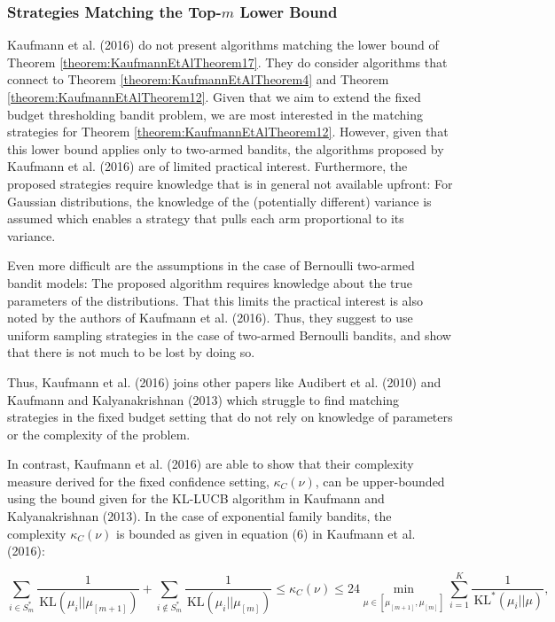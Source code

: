 \documentclass[11pt,]{article}
\newcommand{\KL}{\,\text{KL}}
\begin{document}
\subsubsection{\texorpdfstring{Strategies Matching the Top-\(m\) Lower
Bound}{Strategies Matching the Top-m Lower Bound}}\label{strategies-matching-the-top-m-lower-bound}

Kaufmann et al. (2016) do not present algorithms matching the lower
bound of Theorem \ref{theorem:KaufmannEtAlTheorem17}. They do consider
algorithms that connect to Theorem \ref{theorem:KaufmannEtAlTheorem4}
and Theorem \ref{theorem:KaufmannEtAlTheorem12}. Given that we aim to
extend the fixed budget thresholding bandit problem, we are most
interested in the matching strategies for Theorem
\ref{theorem:KaufmannEtAlTheorem12}. However, given that this lower
bound applies only to two-armed bandits, the algorithms proposed by
Kaufmann et al. (2016) are of limited practical interest. Furthermore,
the proposed strategies require knowledge that is in general not
available upfront: For Gaussian distributions, the knowledge of the
(potentially different) variance is assumed which enables a strategy
that pulls each arm proportional to its variance.

Even more difficult are the assumptions in the case of Bernoulli
two-armed bandit models: The proposed algorithm requires knowledge about
the true parameters of the distributions. That this limits the practical
interest is also noted by the authors of Kaufmann et al. (2016). Thus,
they suggest to use uniform sampling strategies in the case of two-armed
Bernoulli bandits, and show that there is not much to be lost by doing
so.

Thus, Kaufmann et al. (2016) joins other papers like Audibert et al.
(2010) and Kaufmann and Kalyanakrishnan (2013) which struggle to find
matching strategies in the fixed budget setting that do not rely on
knowledge of parameters or the complexity of the problem.

In contrast, Kaufmann et al. (2016) are able to show that their
complexity measure derived for the fixed confidence setting,
\(\kappa_C(\nu)\), can be upper-bounded using the bound given for the
KL-LUCB algorithm in Kaufmann and Kalyanakrishnan (2013). In the case of
exponential family bandits, the complexity \(\kappa_C(\nu)\) is bounded
as given in equation (6) in Kaufmann et al. (2016):

\begin{equation*}
\sum_{i \in S^*_m} \frac{1}{\KL(\mu_i || \mu_{[m+1]})} + \sum_{i \notin S^*_m} \frac{1}{\KL(\mu_i || \mu_{[m]})} \leq \kappa_C(\nu) \leq 24 \min_{\mu \in [\mu_{[m+1]},\mu_{[m]}]} \sum_{i=1}^{K} \frac{1}{\KL^*(\mu_i || \mu)},
\end{equation*}
\end{document}
